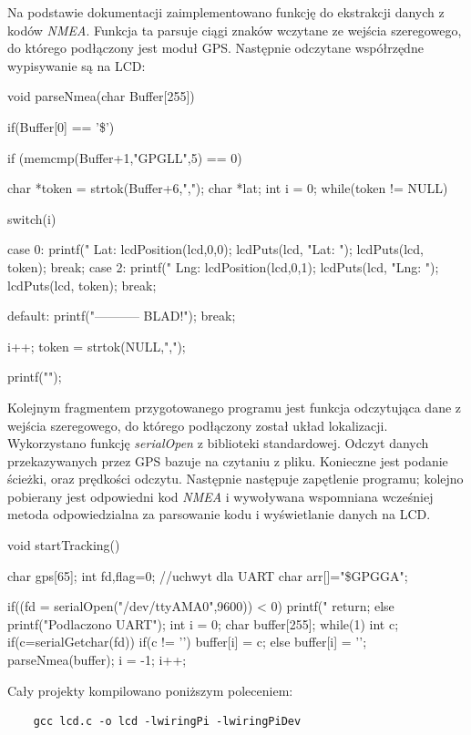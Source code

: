 \documentclass{article}
\begin{document}
		Na podstawie dokumentacji zaimplementowano  funkcję do ekstrakcji danych z kodów \textit{NMEA}. Funkcja ta parsuje ciągi znaków wczytane ze wejścia szeregowego, do którego podłączony jest moduł GPS. Następnie odczytane współrzędne wypisywanie są na LCD:
		\begin{verbatimtab}[4]
	void parseNmea(char Buffer[255])
	{
		if(Buffer[0] == '\$')
		{
		if (memcmp(Buffer+1,"GPGLL",5) == 0)
		{
			char *token = strtok(Buffer+6,",");
			char *lat;
			int i = 0;
			while(token != NULL)
			{
				switch(i)
				{
				case 0:
					printf(" Lat: %
					lcdPosition(lcd,0,0); 
					lcdPuts(lcd, "Lat: ");
					lcdPuts(lcd, token);
				    break;
				case 2:
					printf(" Lng: %
					lcdPosition(lcd,0,1); 
					lcdPuts(lcd, "Lng: "); 
					lcdPuts(lcd, token);
					break;		
			
				default:
					printf("----------- BLAD!\n");
					break;
				}
				i++;
				token = strtok(NULL,",");
				}
			printf("\n");
			}
		}
	}
	\end{verbatimtab}
	
	Kolejnym fragmentem przygotowanego programu jest funkcja odczytująca dane z wejścia szeregowego, do którego podłączony został układ lokalizacji. Wykorzystano funkcję \textit{serialOpen}  z biblioteki standardowej. Odczyt danych przekazywanych przez GPS bazuje na czytaniu z pliku. Konieczne jest podanie ścieżki, oraz prędkości odczytu. Następnie następuje zapętlenie programu; kolejno pobierany jest odpowiedni kod \textit{NMEA} i wywoływana wspomniana wcześniej metoda odpowiedzialna za parsowanie kodu i wyświetlanie danych na LCD.
	\begin{verbatimtab}[4]
	void startTracking()
	{
		char gps[65];
		int fd,flag=0; //uchwyt dla UART
		char arr[]="\$GPGGA";
		
		if((fd = serialOpen("/dev/ttyAMA0",9600)) < 0)
		{
			printf("%
			return;
		} 
		else
		{
			printf("Podlaczono UART\n");
		}
		int i = 0;
		char buffer[255];
		while(1)
		{
		int c;
			if(c=serialGetchar(fd))
			{
				if(c != '\n')
				{
					buffer[i] = c;
				}
				else 
				{
					buffer[i] = '\0';
					parseNmea(buffer);
					i = -1;
				}
				i++;
			}
		}
	}
	\end{verbatimtab}
	
	Cały projekty kompilowano poniższym poleceniem:
	\begin{verbatim}
	gcc lcd.c -o lcd -lwiringPi -lwiringPiDev
	\end{verbatim}
\end{document}
